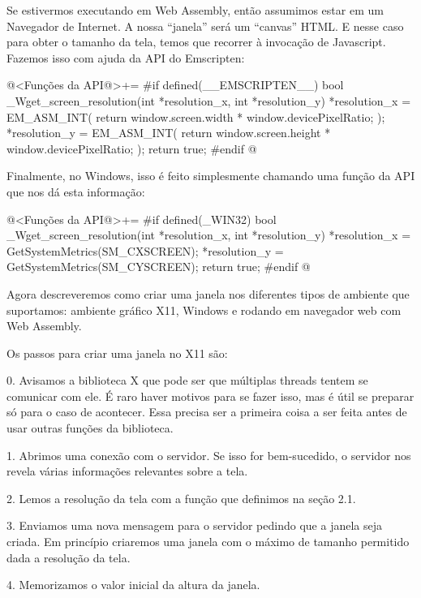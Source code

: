 Se estivermos executando em Web Assembly, então assumimos estar em um
Navegador de Internet. A nossa ``janela'' será um ``canvas'' HTML. E
nesse caso para obter o tamanho da tela, temos que recorrer à
invocação de Javascript. Fazemos isso com ajuda da API do Emscripten:

\iniciocodigo
@<Funções da API@>+=
#if defined(__EMSCRIPTEN__)
bool _Wget_screen_resolution(int *resolution_x, int *resolution_y){
  *resolution_x = EM_ASM_INT({
    return window.screen.width * window.devicePixelRatio;
  });
  *resolution_y = EM_ASM_INT({
    return window.screen.height * window.devicePixelRatio;
  });
  return true;
}
#endif
@
\fimcodigo



Finalmente, no Windows, isso é feito simplesmente chamando uma função
da API que nos dá esta informação:

\iniciocodigo
@<Funções da API@>+=
#if defined(_WIN32)
bool _Wget_screen_resolution(int *resolution_x, int *resolution_y){
  *resolution_x = GetSystemMetrics(SM_CXSCREEN);
  *resolution_y = GetSystemMetrics(SM_CYSCREEN);
  return true;
}
#endif
@
\fimcodigo


Agora descreveremos como criar uma janela nos diferentes tipos de
ambiente que suportamos: ambiente gráfico X11, Windows e rodando em
navegador web com Web Assembly.


Os passos para criar uma janela no X11 são:

0. Avisamos a biblioteca X que pode ser que múltiplas threads tentem
se comunicar com ele. É raro haver motivos para se fazer isso, mas é
útil se preparar só para o caso de acontecer. Essa precisa ser a
primeira coisa a ser feita antes de usar outras funções da biblioteca.

1. Abrimos uma conexão com o servidor. Se isso for bem-sucedido, o
servidor nos revela várias informações relevantes sobre a tela.

2. Lemos a resolução da tela com a função que definimos na seção 2.1.

3. Enviamos uma nova mensagem para o servidor pedindo que a janela
seja criada. Em princípio criaremos uma janela com o máximo de tamanho
permitido dada a resolução da tela.

4. Memorizamos o valor inicial da altura da janela.

